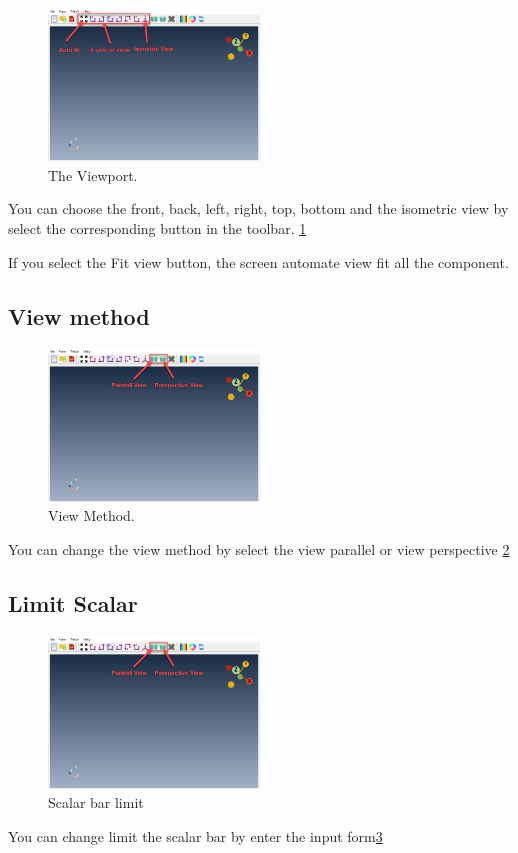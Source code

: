 \documentclass[12pt]{article}
\begin{document}
\begin{figure}
    \includegraphics[width=0.5\textwidth]{images/viewPort.png}
    \caption{The Viewport.}
    \label{fig2}
\end{figure}

You can choose the front, back, left, right, top, bottom and the isometric view by select the corresponding button in the toolbar. \ref{fig2}

If you select the Fit view button, the screen automate view fit all the component.

\newpage

\subsection{View method}

\begin{figure}
    \includegraphics[width=0.5\textwidth]{images/viewMethod.png}
    \caption{View Method.}
    \label{fig3}
\end{figure}
\vspace{0.2cm}
You can change the view method by select the view parallel or view perspective \ref{fig3}

\subsection{Limit Scalar}
\begin{figure}
    \includegraphics[width=0.5\textwidth]{images/viewMethod.png}
    \caption{Scalar bar limit}
    \label{fig4}
\end{figure}



You can change limit the scalar bar by enter the input form\ref{fig4}

\clearpage
\newpage
\end{document}

